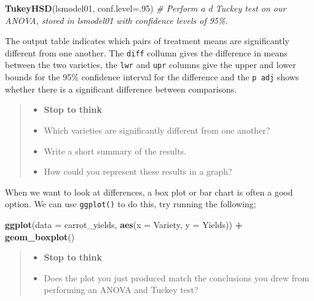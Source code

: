 \documentclass[
]{book}
\newenvironment{Shaded}{\begin{snugshade}}{\end{snugshade}}
\newcommand{\AttributeTok}[1]{\textcolor[rgb]{0.13,0.29,0.53}{#1}}
\newcommand{\CommentTok}[1]{\textcolor[rgb]{0.56,0.35,0.01}{\textit{#1}}}
\newcommand{\DecValTok}[1]{\textcolor[rgb]{0.00,0.00,0.81}{#1}}
\newcommand{\FunctionTok}[1]{\textcolor[rgb]{0.13,0.29,0.53}{\textbf{#1}}}
\newcommand{\NormalTok}[1]{#1}
\newcommand{\SpecialCharTok}[1]{\textcolor[rgb]{0.81,0.36,0.00}{\textbf{#1}}}
\providecommand{\tightlist}{%
  \setlength{\itemsep}{0pt}\setlength{\parskip}{0pt}}
\begin{document}
\begin{Shaded}
\begin{Highlighting}[]
\FunctionTok{TukeyHSD}\NormalTok{(lsmodel01, }\AttributeTok{conf.level=}\NormalTok{.}\DecValTok{95}\NormalTok{) }
\CommentTok{\# Perform a d Tuckey test on our ANOVA, stored in lsmodel01 with confidence levels of 95\%.}
\end{Highlighting}
\end{Shaded}

The output table indicates which pairs of treatment means are significantly different from one another. The \texttt{diff} collumn gives the difference in means between the two varieties, the \texttt{lwr} and \texttt{upr} columns give the upper and lower bounds for the 95\% confidence interval for the difference and the \texttt{p\ adj} shows whether there is a significant difference between comparisons.

\begin{quote}
\begin{itemize}
\tightlist
\item
  \textbf{Stop to think}
\item
  Which varieties are significantly different from one another?
\item
  Write a short summary of the results.
\item
  How could you represent these results in a graph?
\end{itemize}
\end{quote}

When we want to look at differences, a box plot or bar chart is often a good option. We can use \texttt{ggplot()} to do this, try running the following;

\begin{Shaded}
\begin{Highlighting}[]
\FunctionTok{ggplot}\NormalTok{(}\AttributeTok{data =}\NormalTok{ carrot\_yields, }\FunctionTok{aes}\NormalTok{(}\AttributeTok{x =}\NormalTok{ Variety, }\AttributeTok{y =}\NormalTok{ Yields)) }\SpecialCharTok{+}
  \FunctionTok{geom\_boxplot}\NormalTok{()}
\end{Highlighting}
\end{Shaded}

\begin{quote}
\begin{itemize}
\tightlist
\item
  \textbf{Stop to think}
\item
  Does the plot you just produced match the conclusions you drew from performing an ANOVA and Tuckey test?
\end{itemize}
\end{quote}
\end{document}

